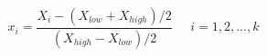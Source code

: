 

\[
x_{i} = \frac{X_{i} - (X_{low} + X_{high})/2}{(X_{high} - X_{low})/2} \;\;\;\;\; i = 1, 2, ..., k

\]


